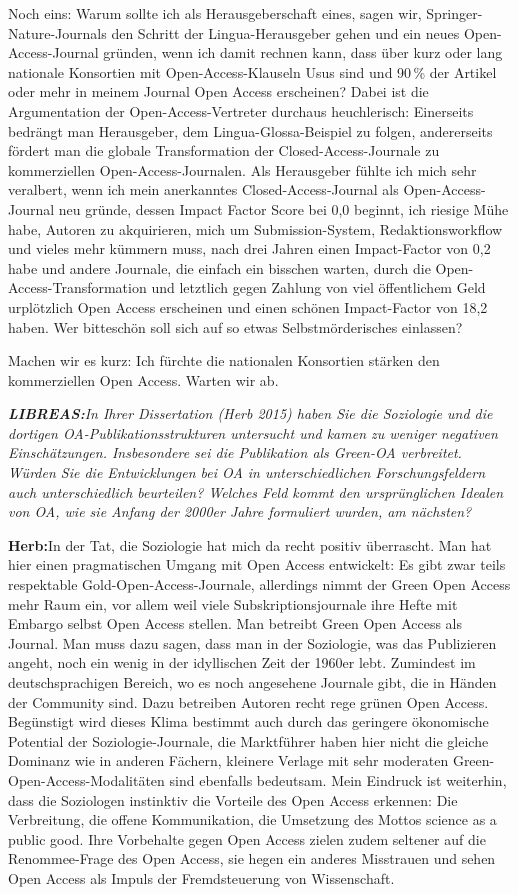 \documentclass[a4paper,
fontsize=11pt,
oneside,
numbers=noperiodatend,
parskip=half-,
bibliography=totoc,
final
]{scrartcl}
\begin{document}
Noch eins: Warum sollte ich als Herausgeberschaft eines, sagen wir,
Springer-Nature-Journals den Schritt der Lingua-Herausgeber gehen und
ein neues Open-Access-Journal gründen, wenn ich damit rechnen kann, dass
über kurz oder lang nationale Konsortien mit Open-Access-Klauseln Usus
sind und 90\,\% der Artikel oder mehr in meinem Journal Open Access
erscheinen? Dabei ist die Argumentation der Open-Access-Vertreter
durchaus heuchlerisch: Einerseits bedrängt man Herausgeber, dem
Lingua-Glossa-Beispiel zu folgen, andererseits fördert man die globale
Transformation der Closed-Access-Journale zu kommerziellen
Open-Access-Journalen. Als Herausgeber fühlte ich mich sehr veralbert,
wenn ich mein anerkanntes Closed-Access-Journal als Open-Access-Journal
neu gründe, dessen Impact Factor Score bei 0,0 beginnt, ich riesige Mühe
habe, Autoren zu akquirieren, mich um Submission-System,
Redaktionsworkflow und vieles mehr kümmern muss, nach drei Jahren einen
Impact-Factor von 0,2 habe und andere Journale, die einfach ein bisschen
warten, durch die Open-Access-Transformation und letztlich gegen Zahlung
von viel öffentlichem Geld urplötzlich Open Access erscheinen und einen
schönen Impact-Factor von 18,2 haben. Wer bitteschön soll sich auf so
etwas Selbstmörderisches einlassen?

Machen wir es kurz: Ich fürchte die nationalen Konsortien stärken den
kommerziellen Open Access. Warten wir ab.

\emph{\textbf{LIBREAS:}In Ihrer Dissertation (Herb 2015) haben Sie die
Soziologie und die dortigen OA-Publikationsstrukturen untersucht und
kamen zu weniger negativen Einschätzungen. Insbesondere sei die
Publikation als Green-OA verbreitet. Würden Sie die Entwicklungen bei OA
in unterschiedlichen Forschungsfeldern auch unterschiedlich beurteilen?
Welches Feld kommt den ursprünglichen Idealen von OA, wie sie Anfang der
2000er Jahre formuliert wurden, am nächsten?}

\textbf{Herb:}In der Tat, die Soziologie hat mich da recht positiv
überrascht. Man hat hier einen pragmatischen Umgang mit Open Access
entwickelt: Es gibt zwar teils respektable Gold-Open-Access-Journale,
allerdings nimmt der Green Open Access mehr Raum ein, vor allem weil
viele Subskriptionsjournale ihre Hefte mit Embargo selbst Open Access
stellen. Man betreibt Green Open Access als Journal. Man muss dazu
sagen, dass man in der Soziologie, was das Publizieren angeht, noch ein
wenig in der idyllischen Zeit der 1960er lebt. Zumindest im
deutschsprachigen Bereich, wo es noch angesehene Journale gibt, die in
Händen der Community sind. Dazu betreiben Autoren recht rege grünen Open
Access. Begünstigt wird dieses Klima bestimmt auch durch das geringere
ökonomische Potential der Soziologie-Journale, die Marktführer haben
hier nicht die gleiche Dominanz wie in anderen Fächern, kleinere Verlage
mit sehr moderaten Green-Open-Access-Modalitäten sind ebenfalls
bedeutsam. Mein Eindruck ist weiterhin, dass die Soziologen instinktiv
die Vorteile des Open Access erkennen: Die Verbreitung, die offene
Kommunikation, die Umsetzung des Mottos science as a public good. Ihre
Vorbehalte gegen Open Access zielen zudem seltener auf die
Renommee-Frage des Open Access, sie hegen ein anderes Misstrauen und
sehen Open Access als Impuls der Fremdsteuerung von Wissenschaft.
\end{document}
